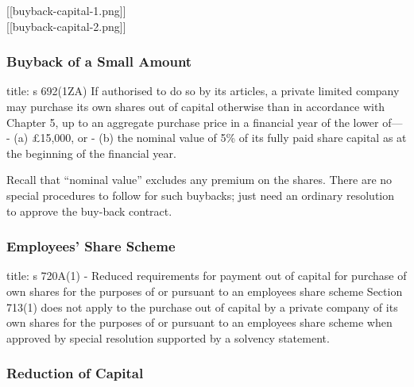\documentclass[
]{article}
\newenvironment{Shaded}{}{}
\newcommand{\NormalTok}[1]{#1}
\begin{document}
{[}{[}buyback-capital-1.png{]}{]}\\
{[}{[}buyback-capital-2.png{]}{]}

\hypertarget{buyback-of-a-small-amount}{%
\subsubsection{Buyback of a Small
Amount}\label{buyback-of-a-small-amount}}

\begin{Shaded}
\begin{Highlighting}[]
\NormalTok{title: s 692(1ZA)}
\NormalTok{If authorised to do so by its articles, a private limited company may purchase its own shares out of capital otherwise than in accordance with Chapter 5, up to an aggregate purchase price in a financial year of the lower of—}
\NormalTok{{-} (a) £15,000, or}
\NormalTok{{-} (b) the nominal value of 5\% of its fully paid share capital as at the beginning of the financial year.}
\end{Highlighting}
\end{Shaded}

Recall that ``nominal value'' excludes any premium on the shares. There
are no special procedures to follow for such buybacks; just need an
ordinary resolution to approve the buy-back contract.

\hypertarget{employees-share-scheme}{%
\subsubsection{Employees' Share Scheme}\label{employees-share-scheme}}

\begin{Shaded}
\begin{Highlighting}[]
\NormalTok{title: s 720A(1) {-} Reduced requirements for payment out of capital for purchase of own shares for the purposes of or pursuant to an employees\textquotesingle{} share scheme}
\NormalTok{Section 713(1) does not apply to the purchase out of capital by a private company of its own shares for the purposes of or pursuant to an employees\textquotesingle{} share scheme when approved by special resolution supported by a solvency statement.}
\end{Highlighting}
\end{Shaded}

\hypertarget{reduction-of-capital}{%
\subsubsection{Reduction of Capital}\label{reduction-of-capital}}
\end{document}
